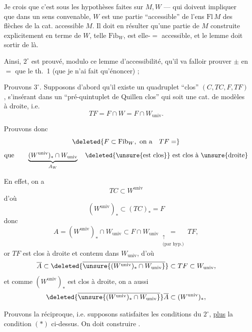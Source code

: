 
Je crois que c'est 
sous les hypothèses faites sur $M,W$ ---
qui doivent impliquer que dans un sens
convenable, $W$ est une partie ``accessible''
de l'ens $\mathrm{Fl}\,M$ des flèches de la cat.
accessible $M$. Il doit en résulter qu'une
partie de $M$ construite explicitement en
terme de $W$, telle $\mathrm{Fib}_W$, est elle-$=$
accessible, et le lemme doit sortir de
là.

Ainsi, $2^\circ$ est prouvé, modulo ce lemme
d'accessibilité, qu'il va falloir prouver
$\pm$ en $=$  que le th.~1 (que je n'ai
fait  qu'énoncer) ;

Prouvons $3^\circ$. Supposons d'abord qu'il existe
un quadruplet ``clos'' $(C,TC,F,TF)$, s'insérant
dans un ``pré-quintuplet de Quillen clos'' qui
soit une cat. de modèles à droite, i.e.
\[
 TF=F\cap W=F\cap W_{\mathrm{univ}}.
\]

 Prouvons donc
\[
 \deleted{F\subset\mathrm{Fib}_W,\ \text{on a}\quad TF=}
\]
\[
 \text{que}\qquad\underbrace{(W^{\mathrm{univ}})_*\cap W_{\mathrm{univ}}}_{A_W}
 \quad\text{\deleted{\unsure{est clos}} est clos à \unsure{droite}}
\]

En effet, on a
\[
 TC\subset W^{\mathrm{univ}}
\]
d'où
\[
 (W^{\mathrm{univ}})_*\subset(TC)_*=F
\]
donc
\[
 A=(W^{\mathrm{univ}})_*\cap W_{\mathrm{univ}}\subset F\cap W_{\mathrm{univ}}
 \underset{\substack{\uparrow\\\text{(par hyp.)}}}{=}TF,
\]
or $TF$ est clos à droite et contenu dans
$W_{\mathrm{univ}}$, d'où
\[
 \overline A\subset\deleted{\overline{\unsure{(W^{\mathrm{univ}})_*\cap W_{\mathrm{univ}}}}}\subset TF\subset W_{\mathrm{univ}},
\]
et comme $(W^{\mathrm{univ}})_*$ est clos à droite, on a aussi
\[
 \deleted{\overline{\unsure{(W^{\mathrm{univ}})_*\cap W_{\mathrm{univ}}}}}\overline A\subset(W^{\mathrm{univ}})_*,
\]

Prouvons la réciproque, i.e. supposons
satisfaites les conditions du $2^\circ$, \uline{plus} la
condition $(*)$ ci-dessus. On doit construire
 .

